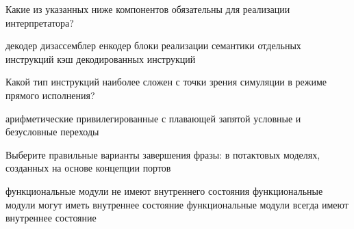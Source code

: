 \documentclass[a4paper, addpoints]{exam}
\begin{document}
\begin{questions}



\question[1] Какие из указанных ниже компонентов обязательны для реализации интерпретатора?
\begin{choices}
    \correctchoice декодер
    \choice дизассемблер
    \choice енкодер
    \correctchoice блоки реализации семантики отдельных инструкций
    \choice кэш декодированных инструкций
\end{choices}

\question[1] Какой тип инструкций наиболее сложен с точки зрения симуляции в режиме прямого исполнения?
\begin{choices}
    \choice арифметические
    \correctchoice привилегированные
    \choice с плавающей запятой
    \choice условные и безусловные переходы
\end{choices}

% 



\question[1] Выберите правильные варианты завершения фразы: в потактовых моделях, созданных на основе концепции портов
\begin{choices}
    \correctchoice функциональные модули не имеют внутреннего состояния
    \choice функциональные модули могут иметь внутреннее состояние
    \choice функциональные модули всегда имеют внутреннее состояние
\end{choices}
    

\end{questions}
\end{document}
